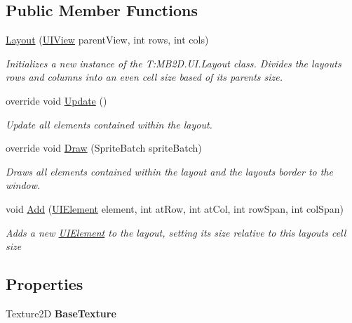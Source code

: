 \subsection*{Public Member Functions}
\begin{DoxyCompactItemize}
\item 
\hyperlink{class_m_b2_d_1_1_u_i_1_1_layout_a86bd9b8fde99644021327ce66b71d0b5}{Layout} (\hyperlink{class_m_b2_d_1_1_u_i_1_1_u_i_view}{U\+I\+View} parent\+View, int rows, int cols)
\begin{DoxyCompactList}\small\item\em Initializes a new instance of the T\+:\+M\+B2\+D.\+U\+I.\+Layout class. Divides the layouts rows and columns into an even cell size based of its parents size. \end{DoxyCompactList}\item 
override void \hyperlink{class_m_b2_d_1_1_u_i_1_1_layout_a88af7d81c8eecdca29c04e2616b69c0c}{Update} ()
\begin{DoxyCompactList}\small\item\em Update all elements contained within the layout. \end{DoxyCompactList}\item 
override void \hyperlink{class_m_b2_d_1_1_u_i_1_1_layout_ae018eee922839254b46610216843afa7}{Draw} (Sprite\+Batch sprite\+Batch)
\begin{DoxyCompactList}\small\item\em Draws all elements contained within the layout and the layouts border to the window. \end{DoxyCompactList}\item 
void \hyperlink{class_m_b2_d_1_1_u_i_1_1_layout_aef7a54a9b1c195a99cdd83d1d526ddd4}{Add} (\hyperlink{class_m_b2_d_1_1_u_i_1_1_u_i_element}{U\+I\+Element} element, int at\+Row, int at\+Col, int row\+Span, int col\+Span)
\begin{DoxyCompactList}\small\item\em Adds a new \hyperlink{class_m_b2_d_1_1_u_i_1_1_u_i_element}{U\+I\+Element} to the layout, setting its size relative to this layouts cell size \end{DoxyCompactList}\end{DoxyCompactItemize}
\subsection*{Properties}
\begin{DoxyCompactItemize}
\item 
\hypertarget{class_m_b2_d_1_1_u_i_1_1_layout_a451dc6b22cf15cfe0660caa9c29f9767}{}\label{class_m_b2_d_1_1_u_i_1_1_layout_a451dc6b22cf15cfe0660caa9c29f9767} 
Texture2D {\bfseries Base\+Texture}
\end{DoxyCompactItemize}
